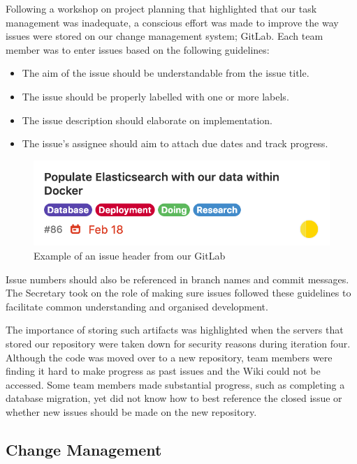 \documentclass{l3proj}
\begin{document}
Following a workshop on project planning that highlighted that our task management was inadequate, a conscious effort was made to improve the way issues were stored on our change management system; GitLab. Each team member was to enter issues based on the following guidelines:

\begin{itemize}
\item The aim of the issue should be understandable from the issue title.
\item The issue should be properly labelled with one or more labels.
\item The issue description should elaborate on implementation.
\item The issue's assignee should aim to attach due dates and track progress.
\end{itemize}

\begin{figure}[h!]
    \centering
    \includegraphics[width=0.4\linewidth]{figures/Project_Planning.png}
    \caption{Example of an issue header from our GitLab}
\end{figure}

Issue numbers should also be referenced in branch names and commit messages. The Secretary took on the role of making sure issues followed these guidelines to facilitate common understanding and organised development.

The importance of storing such artifacts was highlighted when the servers that stored our repository were taken down for security reasons during iteration four. Although the code was moved over to a new repository, team members were finding it hard to make progress as past issues and the Wiki could not be accessed. Some team members made substantial progress, such as completing a database migration, yet did not know how to best reference the closed issue or whether new issues should be made on the new repository.

\subsection{Change Management}
\label{subsec:change_mgmt}
\end{document}

